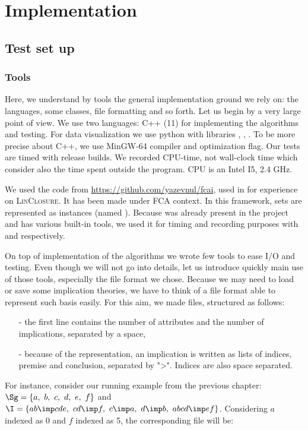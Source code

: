 \chapter{Implementation}



\section{Test set up}

\subsection{Tools}

Here, we understand by tools the general implementation ground we rely on:
the languages, some classes, file formatting and so forth. Let us begin by
a very large point of view. We use two languages: C++ (11) for implementing
the algorithms and testing. For data visualization we use python with libraries , , . To be more precise about C++, 
we use MinGW-64 compiler and  optimization flag. Our tests are timed
with release builds. We recorded CPU-time, not wall-clock time which consider also the time spent outside the program. CPU is an Intel I5, 2.4 GHz.

\vspace{1.2em}

We used the code from \url{https://github.com/yazevnul/fcai}, used in 
\cite{bazhanov_optimizations_2014} for experience on \textsc{LinClosure}. It has been made under FCA context. In this framework, sets are represented as  instances (named ). Because 
was already present in the project and has various built-in tools, we used it
for timing and recording purposes with  and  respectively.

\vspace{1.2em}

On top of implementation of the algorithms we wrote few tools to ease I/O and
testing. Even though we will not go into details, let us introduce quickly
main use of those tools, especially the file format we chose. Because we may need to load or save some implication theories, we have to think of a file format able to represent such basis easily. For this aim, we made 
files, structured as follows:
\begin{itemize}
	\item[-] the first line contains the number of attributes and the number of
	implications, separated by a space,
	\item[-] because of the  representation, an implication is 
	written as lists of indices, premise and conclusion, separated by ">". Indices are also space separated.
\end{itemize}
For instance, consider our running example from the previous chapter:
$\Sg = \{ a, \ b, \  c, \  d, \  e, \ f \}$ and $\I = \{ ab \imp cde, \ cd \imp f, \ c \imp a, \ d \imp b, \  abcd \imp  ef \}$. Considering $a$ indexed as 0 and $f$ indexed as 5, the corresponding  file will be:

